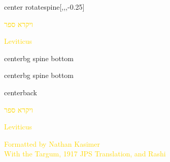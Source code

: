\documentclass[
coverheight=9.93in,%
coverwidth=7.565in,%
spinewidth=.688in,
bleedwidth=.75in,
marklength=0in,
12pt,
pagecolor=darkblue,
]{bookcover}
\newcommand{\hebtext}[1]{
\begin{hebrew}
	#1
\end{hebrew}
}
\begin{document}
	\begin{bookcover}
	\begin{bookcoverelement}{center rotate}{spine}[,,,-0.25\coverheight]
		\LARGE\textcolor{gold}{\hebtext{ויקרא ספר} \space Leviticus }
	\end{bookcoverelement}
	\begin{bookcoverelement}{center}{bg spine bottom}
		\raisebox{\bleedwidth+2\baselineskip}{\textcolor{gold}{Kasimer}}
	\end{bookcoverelement}
	\begin{bookcoverelement}{center}{bg spine bottom}
		\raisebox{\bleedwidth}{\textcolor{gold}{Edition}}
	\end{bookcoverelement}

	\begin{bookcoverelement}{center}{back}
		\begin{Huge}
			\textcolor{gold}{\hebtext{ויקרא ספר}}
			
			\textcolor{gold}{Leviticus}
	
		\end{Huge}
		\vspace{2\baselineskip}
		\begin{large}
			\textcolor{gold}{Formatted by Nathan Kasimer\\With the Targum, 1917 JPS Translation, and Rashi}
		\end{large}
	\end{bookcoverelement}
	\end{bookcover}
	
\end{document}
